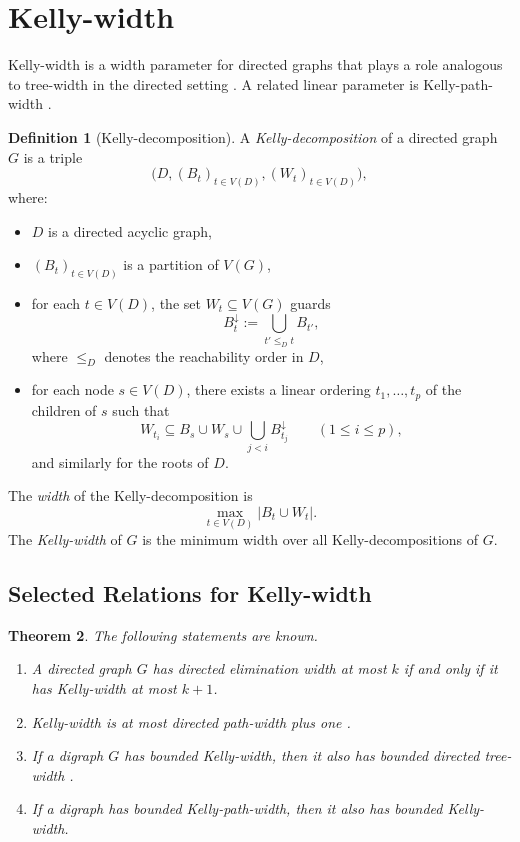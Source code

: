 \documentclass[10pt]{book}
\newtheorem{theorem}{Theorem}[section]
\theoremstyle{definition}
\newtheorem{definition}[theorem]{Definition}
\begin{document}
\section{Kelly-width}

Kelly-width is a width parameter for directed graphs that plays a role analogous to tree-width in the directed setting \cite{28,29}.  
A related linear parameter is Kelly-path-width \cite{357}.

\begin{definition}[Kelly-decomposition]
\cite{28}
A \emph{Kelly-decomposition} of a directed graph \(G\) is a triple
\[
\bigl(D,(B_t)_{t\in V(D)},(W_t)_{t\in V(D)}\bigr),
\]
where:
\begin{itemize}
    \item \(D\) is a directed acyclic graph,
    \item \((B_t)_{t\in V(D)}\) is a partition of \(V(G)\),
    \item for each \(t\in V(D)\), the set \(W_t\subseteq V(G)\) guards
    \[
    B_t^\downarrow:=\bigcup_{t'\leq_D t} B_{t'},
    \]
    where \(\leq_D\) denotes the reachability order in \(D\),
    \item for each node \(s\in V(D)\), there exists a linear ordering \(t_1,\dots,t_p\) of the children of \(s\) such that
    \[
    W_{t_i}\subseteq B_s\cup W_s\cup \bigcup_{j<i} B_{t_j}^\downarrow
    \qquad (1\leq i\leq p),
    \]
    and similarly for the roots of \(D\).
\end{itemize}
The \emph{width} of the Kelly-decomposition is
\[
\max_{t\in V(D)} |B_t\cup W_t|.
\]
The \emph{Kelly-width} of \(G\) is the minimum width over all Kelly-decompositions of \(G\).
\end{definition}

\subsection{Selected Relations for Kelly-width}

\begin{theorem}
The following statements are known.
\begin{enumerate}
    \item A directed graph \(G\) has directed elimination width at most \(k\) if and only if it has Kelly-width at most \(k+1\). \cite{28}

    \item Kelly-width is at most directed path-width plus one \cite{ganian2014digraph}.

    \item If a digraph \(G\) has bounded Kelly-width, then it also has bounded directed tree-width \cite{368,369}.

    \item If a digraph has bounded Kelly-path-width, then it also has bounded Kelly-width.
\end{enumerate}
\end{theorem}
\end{document}

